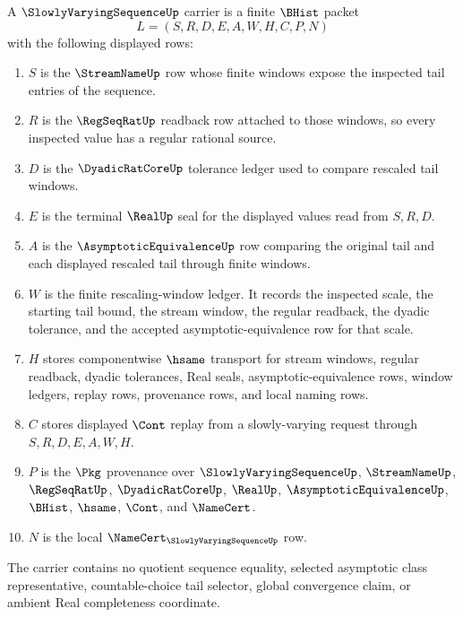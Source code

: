 \begin{definition}
\label{def:slowly-varying-sequence-carrier}
A $\SlowlyVaryingSequenceUp$ carrier is a finite $\BHist$ packet
$$
L=(S,R,D,E,A,W,H,C,P,N)
$$
with the following displayed rows:
\begin{enumerate}
\item $S$ is the $\StreamNameUp$ row whose finite windows expose the inspected tail entries of the sequence.
\item $R$ is the $\RegSeqRatUp$ readback row attached to those windows, so every inspected value has a regular rational source.
\item $D$ is the $\DyadicRatCoreUp$ tolerance ledger used to compare rescaled tail windows.
\item $E$ is the terminal $\RealUp$ seal for the displayed values read from $S,R,D$.
\item $A$ is the $\AsymptoticEquivalenceUp$ row comparing the original tail and each displayed rescaled tail through finite windows.
\item $W$ is the finite rescaling-window ledger. It records the inspected scale, the starting tail bound, the stream window, the regular readback, the dyadic tolerance, and the accepted asymptotic-equivalence row for that scale.
\item $H$ stores componentwise $\hsame$ transport for stream windows, regular readback, dyadic tolerances, Real seals, asymptotic-equivalence rows, window ledgers, replay rows, provenance rows, and local naming rows.
\item $C$ stores displayed $\Cont$ replay from a slowly-varying request through $S,R,D,E,A,W,H$.
\item $P$ is the $\Pkg$ provenance over $\SlowlyVaryingSequenceUp$, $\StreamNameUp$, $\RegSeqRatUp$, $\DyadicRatCoreUp$, $\RealUp$, $\AsymptoticEquivalenceUp$, $\BHist$, $\hsame$, $\Cont$, and $\NameCert$.
\item $N$ is the local $\NameCert_{\SlowlyVaryingSequenceUp}$ row.
\end{enumerate}
The carrier contains no quotient sequence equality, selected asymptotic class representative, countable-choice tail selector, global convergence claim, or ambient Real completeness coordinate.
\end{definition}

